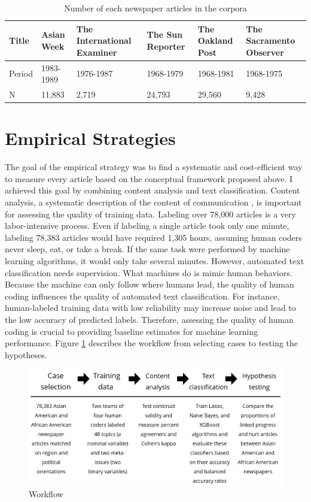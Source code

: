 \documentclass[12 pt]{article}
\begin{document}
\begin{table}[htbp!]
\centering
\begin{tabularx}{\linewidth}{X|X|X|X|X|X}
\toprule
Title & Asian Week & The International Examiner & The Sun Reporter & The Oakland Post & The Sacramento Observer \\
\midrule 
Period & 1983-1989 & 1976-1987 & 1968-1979 & 1968-1981 & 1968-1975\\
\midrule
N & 11,883 & 2,719 & 24,793 & 29,560 & 9,428\\
\bottomrule
\end{tabularx}
\caption{\label{tab:}Number of each newspaper articles in the corpora}
\end{table}

\section{Empirical Strategies}
The goal of the empirical strategy was to find a systematic and cost-efficient way to measure every article based on the conceptual framework proposed above. I achieved this goal by combining content analysis and text classification. Content analysis, a systematic description of the content of communication \citep[18]{berelson1952content}, is important for assessing the quality of training data. Labeling over 78,000 articles is a very labor-intensive process. Even if labeling a single article took only one minute, labeling 78,383 articles would have required 1,305 hours, assuming human coders never sleep, eat, or take a break. If the same task were performed by machine learning algorithms, it would only take several minutes. However, automated text classification needs supervision. What machines do is mimic human behaviors. Because the machine can only follow where humans lead, the quality of human coding influences the quality of automated text classification. For instance, human-labeled training data with low reliability may increase noise and lead to the low accuracy of predicted labels. Therefore, assessing the quality of human coding is crucial to providing baseline estimates for machine learning performance. Figure \ref{fig:workflow} describes the workflow from selecting cases to testing the hypotheses.

\begin{figure}[htbp!]
    \centering
    \includegraphics[width=1\linewidth]{workflow.png}
    \caption{Workflow}
    \label{fig:workflow}
\end{figure}
\end{document}
